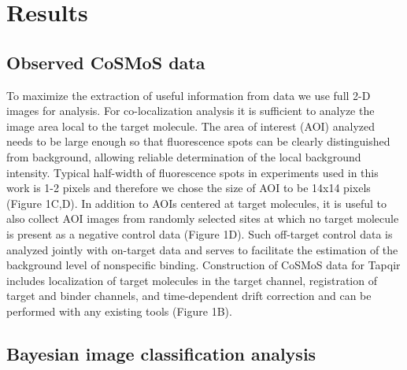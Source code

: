\section*{Results}

\subsection*{Observed CoSMoS data} %

To maximize the extraction of useful information from data we use full 2-D images for analysis. For co-localization analysis it is sufficient to analyze the image area local to the target molecule. The area of interest (AOI) analyzed needs to be large enough so that fluorescence spots can be clearly distinguished from background, allowing  reliable  determination of the  local  background  intensity. Typical half-width of fluorescence spots in experiments used in this work is 1-2 pixels and therefore we chose the size of AOI to be 14x14 pixels (Figure 1C,D). In addition to AOIs centered at target molecules, it is useful to also collect AOI images from randomly selected sites at which no target molecule is present as a negative control data (Figure 1D). Such off-target control data is analyzed jointly with on-target data and serves to facilitate the estimation of the background level of nonspecific binding. Construction of CoSMoS data for Tapqir includes localization of target molecules in the target channel, registration of target and binder channels, and time-dependent drift correction and can be performed with any existing tools \cite{Friedman2015-nx, Smith2019-yb} (Figure 1B).


\subsection*{Bayesian image classification analysis}

